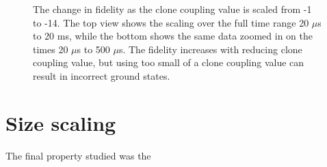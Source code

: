 \begin{figure}
	\caption[Variable Clone Coupling Fidelity]{The change in fidelity as the clone coupling value is scaled from -1 to -14.  The top view shows the scaling over the full time range 20 $\mu$s to 20 ms, while the bottom shows the same data zoomed in on the times 20 $\mu$s to 500 $\mu$s.  The fidelity increases with reducing clone coupling value, but using too small of a clone coupling value can result in incorrect ground states.}
	\label{fig:clone_coupling}
\end{figure}

\section{Size scaling}
The final property studied was the 
